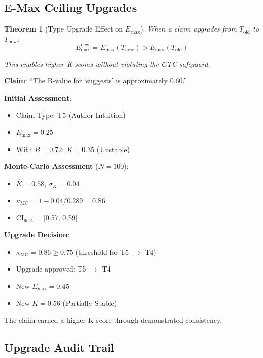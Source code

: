 \documentclass[11pt,a4paper]{article}
\newtheorem{theorem}{Theorem}[section]
\theoremstyle{remark}
\begin{document}
\subsection{E-Max Ceiling Upgrades}

\begin{theorem}[Type Upgrade Effect on $E_{\max}$]
\label{thm:upgrade-effect}
When a claim upgrades from $T_{\text{old}}$ to $T_{\text{new}}$:
\begin{equation}
E_{\max}^{\text{new}} = E_{\max}(T_{\text{new}}) > E_{\max}(T_{\text{old}})
\end{equation}

This enables higher K-scores without violating the CTC safeguard.
\end{theorem}

\begin{examplebox}[title={Type Upgrade Example}]
\textbf{Claim}: ``The B-value for `suggests' is approximately 0.60.''

\textbf{Initial Assessment}:
\begin{itemize}
    \item Claim Type: T5 (Author Intuition)
    \item $E_{\max} = 0.25$
    \item With $B = 0.72$: $K = 0.35$ (Unstable)
\end{itemize}

\textbf{Monte-Carlo Assessment} ($N = 100$):
\begin{itemize}
    \item $\hat{K} = 0.58$, $\sigma_K = 0.04$
    \item $\kappa_{\text{MC}} = 1 - 0.04/0.289 = 0.86$
    \item CI$_{95\%}$ = [0.57, 0.59]
\end{itemize}

\textbf{Upgrade Decision}:
\begin{itemize}
    \item $\kappa_{\text{MC}} = 0.86 \geq 0.75$ (threshold for T5 $\to$ T4)
    \item Upgrade approved: T5 $\to$ T4
    \item New $E_{\max} = 0.45$
    \item New $K = 0.56$ (Partially Stable)
\end{itemize}

The claim earned a higher K-score through demonstrated consistency.
\end{examplebox}

\subsection{Upgrade Audit Trail}
\end{document}
